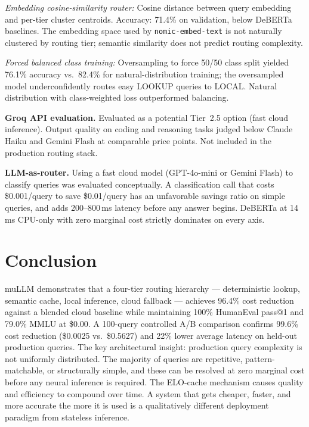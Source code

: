 \documentclass[11pt]{article}
\begin{document}
\textit{Embedding cosine-similarity router:} Cosine distance between
query embedding and per-tier cluster centroids. Accuracy: 71.4\% on
validation, below DeBERTa baselines. The embedding space used by
\texttt{nomic-embed-text} is not naturally clustered by routing tier;
semantic similarity does not predict routing complexity.

\textit{Forced balanced class training:} Oversampling to force 50/50
class split yielded 76.1\% accuracy vs.\ 82.4\% for natural-distribution
training; the oversampled model underconfidently routes easy LOOKUP
queries to LOCAL. Natural distribution with class-weighted loss
outperformed balancing.

\textbf{Groq API evaluation.} Evaluated as a potential Tier~2.5 option
(fast cloud inference). Output quality on coding and reasoning tasks
judged below Claude Haiku and Gemini Flash at comparable price points.
Not included in the production routing stack.

\textbf{LLM-as-router.} Using a fast cloud model (GPT-4o-mini or
Gemini Flash) to classify queries was evaluated conceptually. A
classification call that costs \$0.001/query to save \$0.01/query has
an unfavorable savings ratio on simple queries, and adds 200--800\,ms
latency before any answer begins. DeBERTa at 14\,ms CPU-only with zero
marginal cost strictly dominates on every axis.

\section{Conclusion}

muLLM demonstrates that a four-tier routing hierarchy --- deterministic
lookup, semantic cache, local inference, cloud fallback --- achieves
96.4\% cost reduction against a blended cloud baseline while maintaining
100\% HumanEval pass@1 and 79.0\% MMLU at \$0.00. A 100-query
controlled A/B comparison confirms 99.6\% cost reduction (\$0.0025
vs.\ \$0.5627) and 22\% lower average latency on held-out production
queries. The key architectural insight: production query complexity is
not uniformly distributed. The majority of queries are repetitive,
pattern-matchable, or structurally simple, and these can be resolved at
zero marginal cost before any neural inference is required. The ELO-cache
mechanism causes quality and efficiency to compound over time. A system
that gets cheaper, faster, and more accurate the more it is used is a
qualitatively different deployment paradigm from stateless inference.
\end{document}
